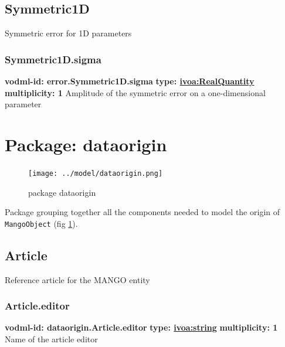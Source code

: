  \subsection{Symmetric1D}
  \label{sect:error.Symmetric1D}
    Symmetric error for 1D parameters

    \subsubsection{Symmetric1D.sigma}
      \textbf{vodml-id: error.Symmetric1D.sigma} \newline
      \textbf{type: \hyperref[sect:ivoa]{ivoa:RealQuantity}} \newline
      \textbf{multiplicity: 1} \newline
      Amplitude of the symmetric error on a one-dimensional parameter

\pagebreak
\section{Package: dataorigin }
  \begin{figure}[h]
    \texttt{[image: ../model/dataorigin.png]}
    \caption{package dataorigin}
    \label{fig:dataorigin}
  \end{figure}




  Package grouping together all the components needed to model the origin of \texttt{MangoObject} (fig \ref{fig:dataorigin}).

  \subsection{Article}
  \label{sect:dataorigin.Article}
    Reference article for the MANGO entity

    \subsubsection{Article.editor}
      \textbf{vodml-id: dataorigin.Article.editor} \newline
      \textbf{type: \hyperref[sect:ivoa]{ivoa:string}} \newline
      \textbf{multiplicity: 1} \newline
      Name of the article editor


